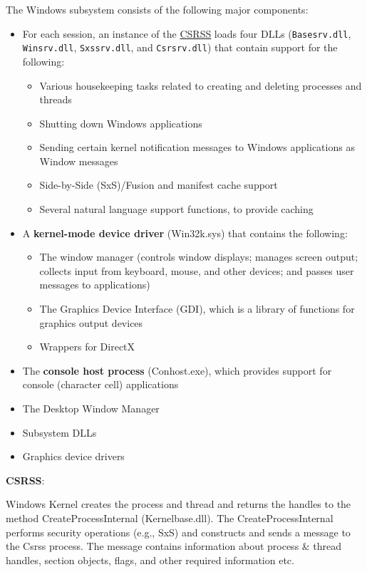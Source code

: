 The Windows subsystem consists of the following major components:
\begin{itemize}
    \item For each session, an instance of the \href{https://medium.com/@ijaz.faheem/windows-environment-subsystems-csrss-synch-with-windows-kernel-on-the-windows-user-process-164d57f2a81b}{CSRSS} loads four DLLs (\verb+Basesrv.dll+, \verb+Winsrv.dll+, \verb+Sxssrv.dll+, and \verb+Csrsrv.dll+) that contain support for the following:
        \begin{itemize}
            \item Various housekeeping tasks related to creating and deleting processes and threads
            \item Shutting down Windows applications
            \item Sending certain kernel notification messages to Windows applications as Window messages
            \item Side-by-Side (SxS)/Fusion and manifest cache support
            \item Several natural language support functions, to provide caching
        \end{itemize}
    \item A {\bf kernel-mode device driver} (Win32k.sys) that contains the following:
        \begin{itemize}
            \item The window manager (controls window displays; manages screen output; collects input
            from keyboard, mouse, and other devices; and passes user messages to applications)
            \item The Graphics Device Interface (GDI), which is a library of functions for graphics output devices
            \item Wrappers for DirectX
        \end{itemize}
    \item The {\bf console host process} (Conhost.exe), which provides support for console (character cell)
    applications
    \item The Desktop Window Manager
    \item Subsystem DLLs
    \item Graphics device drivers
\end{itemize}

{\bf CSRSS}:

Windows Kernel creates the process and thread and returns the handles to the method CreateProcessInternal (Kernelbase.dll). The CreateProcessInternal performs security operations (e.g., SxS) and constructs and sends a message to the Csrss process. The message contains information about process \& thread handles, section objects, flags, and other required information etc.


